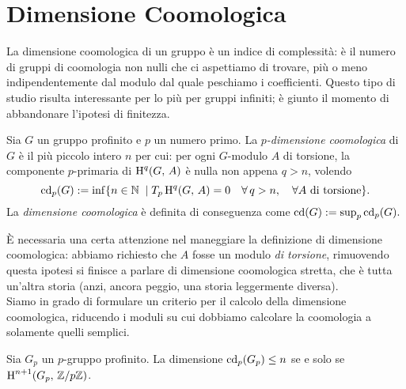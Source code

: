 \section{Dimensione Coomologica}
La dimensione coomologica di un gruppo è un indice di complessità: è il numero di gruppi di coomologia non nulli che ci aspettiamo di trovare, più o meno indipendentemente dal modulo dal quale peschiamo i coefficienti. Questo tipo di studio risulta interessante per lo più per gruppi infiniti; è giunto il momento di abbandonare l'ipotesi di finitezza.
\begin{definition}
	Sia $ G $ un gruppo profinito e $ p $ un numero primo. La \emph{$ p $-dimensione coomologica} di $ G $ è il più piccolo intero $ n $ per cui: per ogni $ G $-modulo $ A $ di torsione, la componente $ p $-primaria di $ \operatorname{H}^q(G, \, A) $ è nulla non appena $ q > n $, volendo
	\[ \operatorname{cd}_p(G) := \inf \{ n \in \mathbb{N} \; \mid T_p\operatorname{H}^q(G, \, A)=0\quad \forall \, q > n, \quad \forall A \text{ di torsione} \}. \]
	La \emph{dimensione coomologica} è definita di conseguenza come $ \operatorname{cd}(G) := \sup_p \operatorname{cd}_p(G). $
\end{definition}

È necessaria una certa attenzione nel maneggiare la definizione di dimensione coomologica: abbiamo richiesto che $ A $ fosse un modulo \emph{di torsione}, rimuovendo questa ipotesi si finisce a parlare di dimensione coomologica stretta, che è tutta un'altra storia (anzi, ancora peggio, una storia leggermente diversa). \\

Siamo in grado di formulare un criterio per il calcolo della dimensione coomologica, riducendo i moduli su cui dobbiamo calcolare la coomologia a solamente quelli semplici.

\begin{proposition}
	Sia $ G_p $ un $ p $-gruppo profinito. La dimensione $ \operatorname{cd}_p(G_p) \leq n $ se e solo se $ \operatorname{H}^{n+1}(G_p, \, \mathbb{Z}/p\mathbb{Z}) $. 
\end{proposition}

